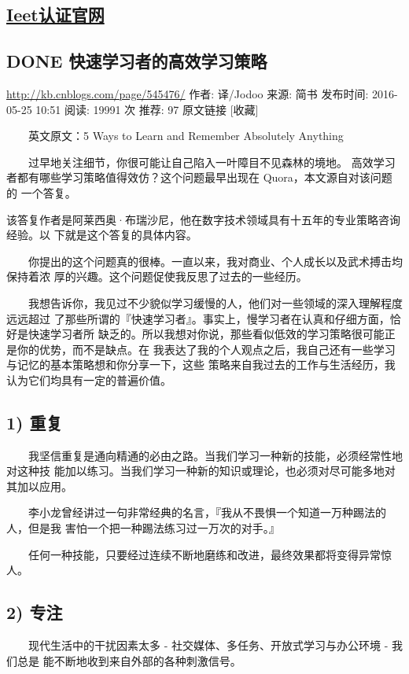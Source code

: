\documentclass[11pt]{ctexart}
\begin{document}
{{{{\subsection{\href{http://www.ieet.org.tw/InfoT.aspx?n=TeachingAward}{Ieet认证官网}}
\label{sec:orga7c1b9c}

\subsection{{\bfseries\sffamily DONE} 快速学习者的高效学习策略}
\label{sec:org51f4524}
\url{http://kb.cnblogs.com/page/545476/}
作者: 译/Jodoo  来源: 简书  发布时间: 2016-05-25 10:51  阅读: 19991 次  推荐: 97
原文链接   [收藏]


　　英文原文：5 Ways to Learn and Remember Absolutely Anything

　　过早地关注细节，你很可能让自己陷入一叶障目不见森林的境地。
高效学习者都有哪些学习策略值得效仿？这个问题最早出现在 Quora，本文源自对该问题的
一个答复。


该答复作者是阿莱西奥·布瑞沙尼，他在数字技术领域具有十五年的专业策略咨询经验。以
下就是这个答复的具体内容。

　　你提出的这个问题真的很棒。一直以来，我对商业、个人成长以及武术搏击均保持着浓
厚的兴趣。这个问题促使我反思了过去的一些经历。

　　我想告诉你，我见过不少貌似学习缓慢的人，他们对一些领域的深入理解程度远远超过
了那些所谓的『快速学习者』。事实上，慢学习者在认真和仔细方面，恰好是快速学习者所
缺乏的。所以我想对你说，那些看似低效的学习策略很可能正是你的优势，而不是缺点。在
我表达了我的个人观点之后，我自己还有一些学习与记忆的基本策略想和你分享一下，这些
策略来自我过去的工作与生活经历，我认为它们均具有一定的普遍价值。

\subsection{1) 重复}
\label{sec:orga036d2f}
　　我坚信重复是通向精通的必由之路。当我们学习一种新的技能，必须经常性地对这种技
能加以练习。当我们学习一种新的知识或理论，也必须对尽可能多地对其加以应用。

　　李小龙曾经讲过一句非常经典的名言，『我从不畏惧一个知道一万种踢法的人，但是我
害怕一个把一种踢法练习过一万次的对手。』

　　任何一种技能，只要经过连续不断地磨练和改进，最终效果都将变得异常惊人。
\subsection{2) 专注}
\label{sec:org54ebac6}
　　现代生活中的干扰因素太多 - 社交媒体、多任务、开放式学习与办公环境 - 我们总是
能不断地收到来自外部的各种刺激信号。

}}}}
\end{document}
